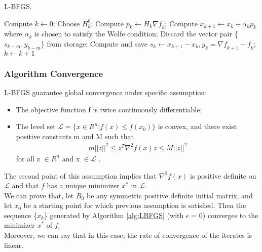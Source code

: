 \begin{algorithm}[H]
	\caption{L-BFGS.}
	\label{alg:LBFGS}
	\begin{algorithmic}[4]
		\State Compute $k \gets 0$;
		\Repeat
		\State Choose \textbf{$H^0_k$};
		\State Compute $p_k \gets H_k\nabla \textit{f}_k$;
		\State Compute $x_{k+1} \gets x_{k}+ \alpha_{k}p_{k}$ where $\alpha_{k}$ is chosen to satisfy the Wolfe condition;
		\State Discard the vector pair \{$s_{k-m},y_{k-m}$\} from storage;
		\EndIf
		\State Compute and save $s_k \gets x_{k+1}-x_{k}, y_k=\nabla \textit{f}_{k+1}-\textit{f}_k$;
		\State $k \gets k+1$
		\EndProcedure 
	\end{algorithmic}
\end{algorithm}

\subsubsection{Algorithm Convergence}

L-BFGS guarantee global convergence under specific assumption:
\begin{itemize} \label{convergence:assumption}
	\item The objective function f is twice continuously differentiable;
	\item The level set $ \mathcal{L} = \{x \in R^n | \mathit{f(x)}  \leq  \mathit{f(x_0)}\}$ is convex, and there exist positive constants m and M such that 
	\begin{align}
	m||z||^2 \leq z^T \nabla^2f(x)z \leq M||z||^2
	\end{align}
	for all z $\in R^n$  and x $\in \mathcal{L}$ .
\end{itemize}

The second point of this assumption implies that $\nabla^2f(x)$ is positive definite on $\mathcal{L}$ and that $\mathit{f}$ has a unique minimizer $x^*$ in $\mathcal{L}$.
\\
We can prove that, let $B_0$ be any symmetric positive definite initial matrix, and let $x_0$ be a starting point for which previous assumption is satisfied. Then the sequence \{$x_k$\} generated by Algorithm \ref{alg:LBFGS} (with $\epsilon$ = 0) converges to the minimizer $x^*$ of $\mathit{f}$.
\\
Moreover, we can say that in this case, the rate of convergence of the iterates
is linear.






